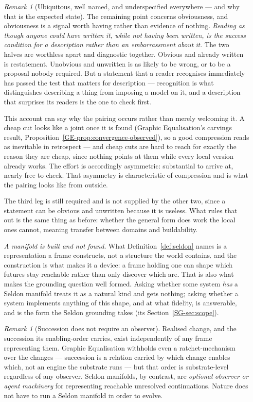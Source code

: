 \documentclass[11pt,a4paper]{article}
\theoremstyle{remark}
\newtheorem{remark}[definition]{Remark}
\begin{document}
\begin{remark}[Ubiquitous, well named, and underspecified everywhere --- and why that is the expected state]
The remaining point concerns obviousness, and obviousness is a signal worth having rather than
evidence of nothing. \emph{Reading as though anyone
could have written it, while not having been written, is the success condition for a description
rather than an embarrassment about it.} The two halves are worthless apart and diagnostic together.
Obvious and already written is restatement. Unobvious and unwritten is as likely to be wrong, or to be
a proposal nobody required. But a statement that a reader recognises immediately has passed the test
that matters for description --- recognition is what distinguishes describing a thing from imposing a
model on it, and a description that surprises its readers is the one to check first.

This account can say why the pairing occurs rather than merely welcoming it. A cheap cut looks like a
joint once it is found (Graphic Equalisation's carvings result,
Proposition~\ref{GE-prop:convergence-observed}), so a good compression reads as
inevitable in retrospect --- and cheap cuts are hard to reach for exactly the reason they are cheap,
since nothing points at them while every local version already works. The effort is accordingly
asymmetric: substantial to arrive at, nearly free to check. That asymmetry is characteristic of
compression and is what the pairing looks like from outside.

The third leg is still required and is not supplied by the other two, since a statement can be obvious
and unwritten because it is useless. What rules that out is the same thing as before: whether the
general form does work the local ones cannot, meaning transfer between domains and buildability.
\end{remark}

\emph{A manifold is built and not found.} What Definition~\ref{def:seldon} names is a representation a
frame constructs, not a structure the world contains, and the construction is what makes it a device: a
frame holding one can shape which futures stay reachable rather than only discover which are. That is
also what makes the grounding question well formed. Asking whether some system \emph{has} a Seldon
manifold treats it as a natural kind and gets nothing; asking whether a system implements anything of
this shape, and at what fidelity, is answerable, and is the form the Seldon grounding takes (its
Section~\ref{SG-sec:scope}).

\begin{remark}[Succession does not require an observer]\label{rem:ratchet-first}
Realised change, and the succession its enabling-order carries, exist independently of any frame representing them. Graphic Equalisation withholds even a ratchet-mechanism over the changes --- succession is a relation carried by which change enables which, not an engine the substrate runs --- but that order is substrate-level regardless of any observer. Seldon manifolds, by contrast, are \emph{optional observer or agent machinery} for representing reachable unresolved continuations. Nature does not have to run a Seldon manifold in order to evolve.
\end{remark}
\end{document}
